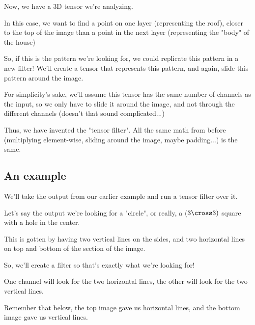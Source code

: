         Now, we have a 3D tensor we're analyzing. 
        
        In this case, we want to find a point on one layer (representing the roof), closer to the top of the image than a point in the next layer (representing the "body" of the house)
        
        So, if this is the pattern we're looking for, we could replicate this pattern in a new filter! We'll create a tensor that represents this pattern, and again, slide this pattern around the image.
        
        For simplicity's sake, we'll assume this tensor has the same number of channels as the input, so we only have to slide it around the image, and not through the different channels (doesn't that sound complicated...)
        
        Thus, we have invented the "tensor filter". All the same math from before (multiplying element-wise, sliding around the image, maybe padding...) is the same.
        
    \subsection{An example}
    
        We'll take the output from our earlier example and run a tensor filter over it.
        
        Let's say the output we're looking for a "circle", or really, a ($3 \cross 3)$ square with a hole in the center.
        
        This is gotten by having two vertical lines on the sides, and two horizontal lines on top and bottom of the section of the image.
        
        So, we'll create a filter so that's exactly what we're looking for!
        
        One channel will look for the two horizontal lines, the other will look for the two vertical lines.
        
        Remember that below, the top image gave us horizontal lines, and the bottom image gave us vertical lines.
        


